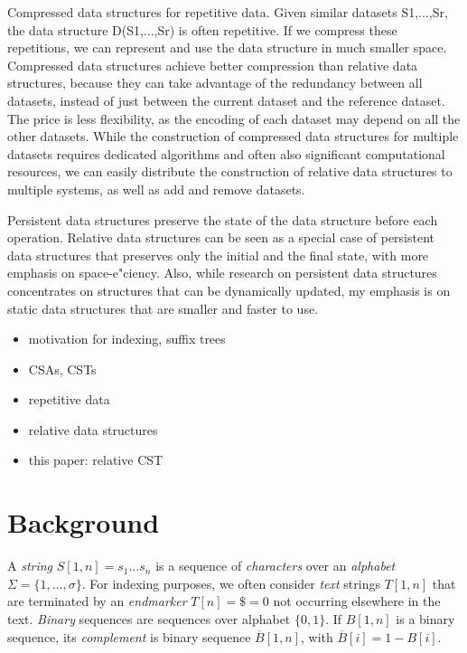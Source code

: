 \documentclass[a4paper,11pt]{llncs}
\newcommand{\set}[1]{\ensuremath{\{ #1 \}}}
\renewcommand{\complement}[1]{\ensuremath{\overline{ #1 }}}
\begin{document}
Compressed data structures for repetitive data. Given similar datasets S1,...,Sr, the
data structure D(S1,...,Sr) is often repetitive. If we compress these repetitions, we can
represent and use the data structure in much smaller space. Compressed data structures
achieve better compression than relative data structures, because they can take advantage
of the redundancy between all datasets, instead of just between the current dataset and
the reference dataset. The price is less flexibility, as the encoding of each dataset may
depend on all the other datasets. While the construction of compressed data structures for
multiple datasets requires dedicated algorithms and often also significant computational
resources, we can easily distribute the construction of relative data structures to multiple
systems, as well as add and remove datasets.

Persistent data structures preserve the state of the data structure before each operation.
Relative data structures can be seen as a special case of persistent data structures
that preserves only the initial and the final state, with more emphasis on space-e"ciency.
Also, while research on persistent data structures concentrates on structures that can be
dynamically updated, my emphasis is on static data structures that are smaller and faster
to use.
\fi

\begin{itemize}
\item motivation for indexing, suffix trees
\item CSAs, CSTs
\item repetitive data
\item relative data structures
\item this paper: relative CST
\end{itemize}


\section{Background}

A \emph{string} $S[1,n] = s_{1} \dotso s_{n}$ is a sequence of \emph{characters} over an \emph{alphabet} $\Sigma = \set{1, \dotsc, \sigma}$. For indexing purposes, we often consider \emph{text} strings $T[1,n]$ that are terminated by an \emph{endmarker} $T[n] = \$ = 0$ not occurring elsewhere in the text. \emph{Binary} sequences are sequences over alphabet $\set{0,1}$. If $B[1,n]$ is a binary sequence, its \emph{complement} is binary sequence $\complement{B}[1,n]$, with $\complement{B}[i] = 1 - B[i]$.
\end{document}
